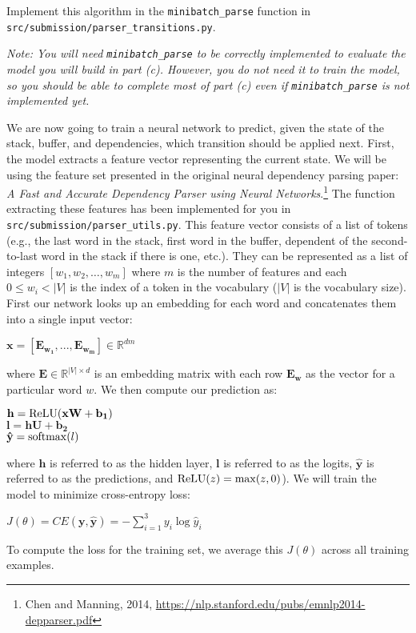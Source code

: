 \begin{enumerate}[(a)]
    Implement this algorithm in the \texttt{minibatch\_parse} function in \texttt{src/submission/parser\_transitions.py}.

    \textit{Note: You will need \texttt{minibatch\_parse} to be correctly implemented to evaluate the model you will build in part (c). However, you do not need it to train the model, so you should be able to complete most of part (c) even if \texttt{minibatch\_parse} is not implemented yet.} \newline
    
    We are now going to train a neural network to predict, given the state of the stack, buffer, and dependencies, which transition should be applied next.
    First, the model extracts a feature vector representing the current state. We will be using the feature set presented in the original neural dependency parsing paper: \textit{A Fast and Accurate Dependency Parser using Neural Networks}.\footnote{Chen and Manning, 2014, \url{https://nlp.stanford.edu/pubs/emnlp2014-depparser.pdf}} The function extracting these features has been implemented for you in \texttt{src/submission/parser\_utils.py}. This feature vector consists of a list of tokens (e.g., the last word in the stack, first word in the buffer, dependent of the second-to-last word in the stack if there is one, etc.). They can be represented as a list of integers $[w_1, w_2, \dots, w_m]$ where $m$ is the number of features and each $0 \leq w_i <  \vert V \vert$ is the index of a token in the vocabulary ($ \vert V \vert $ is the vocabulary size). First our network looks up an embedding for each word and concatenates them into a single input vector:
    \begin{center}
    	$ \mathbf{x} = [\mathbf{E_{w_1}} , ... , \mathbf{E_{w_m}}] \in \mathbb{R}^{dm}$
    \end{center}
    where $\mathbf{E} \in \mathbb{R}^{ \vert V \vert \times d}$ is an embedding matrix with each row $\mathbf{E_w}$ as the vector for a particular word $w$. We then compute our prediction as:
    \begin{center}
        $ \mathbf{h} = \operatorname{ReLU} (\mathbf{xW} + \mathbf{b_1})$ \\
        $ \mathbf{l} = \mathbf{hU} + \mathbf{b_2}$ \\
        $ \mathbf{\hat{y}} = \operatorname{softmax}(l)$\\
    \end{center}
    where $\mathbf{h}$ \space is referred to as the hidden layer, $\mathbf{l}$ \space is referred to as the logits, $\mathbf{\hat{y}}$ \space is referred to as the predictions, and $\operatorname{ReLU}(z) = \max(z, 0)$). We will train the model to minimize cross-entropy loss:
    \begin{center}
        $J(\theta) = CE(\mathbf{y}, \mathbf{\hat{y}}) = - \sum_{i=1}^3 y_i \log \hat{y}_i$
    \end{center}
    To compute the loss for the training set, we average this $J(\theta)$ across all training examples.


\end{enumerate}

